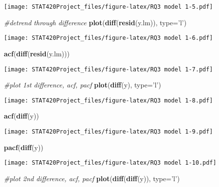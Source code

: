 \documentclass[]{article}
\newenvironment{Shaded}{\begin{snugshade}}{\end{snugshade}}
\newcommand{\CommentTok}[1]{\textcolor[rgb]{0.56,0.35,0.01}{\textit{#1}}}
\newcommand{\DataTypeTok}[1]{\textcolor[rgb]{0.13,0.29,0.53}{#1}}
\newcommand{\KeywordTok}[1]{\textcolor[rgb]{0.13,0.29,0.53}{\textbf{#1}}}
\newcommand{\NormalTok}[1]{#1}
\newcommand{\StringTok}[1]{\textcolor[rgb]{0.31,0.60,0.02}{#1}}
\begin{document}
\texttt{[image: STAT420Project\_files/figure-latex/RQ3 model 1-5.pdf]}

\begin{Shaded}
\begin{Highlighting}[]
\CommentTok{#detrend through difference}
\KeywordTok{plot}\NormalTok{(}\KeywordTok{diff}\NormalTok{(}\KeywordTok{resid}\NormalTok{(y.lm)), }\DataTypeTok{type=}\StringTok{'l'}\NormalTok{)}
\end{Highlighting}
\end{Shaded}

\texttt{[image: STAT420Project\_files/figure-latex/RQ3 model 1-6.pdf]}

\begin{Shaded}
\begin{Highlighting}[]
\KeywordTok{acf}\NormalTok{(}\KeywordTok{diff}\NormalTok{(}\KeywordTok{resid}\NormalTok{(y.lm)))}
\end{Highlighting}
\end{Shaded}

\texttt{[image: STAT420Project\_files/figure-latex/RQ3 model 1-7.pdf]}

\begin{Shaded}
\begin{Highlighting}[]
\CommentTok{#plot 1st difference, acf, pacf}
\KeywordTok{plot}\NormalTok{(}\KeywordTok{diff}\NormalTok{(y), }\DataTypeTok{type=}\StringTok{'l'}\NormalTok{)}
\end{Highlighting}
\end{Shaded}

\texttt{[image: STAT420Project\_files/figure-latex/RQ3 model 1-8.pdf]}

\begin{Shaded}
\begin{Highlighting}[]
\KeywordTok{acf}\NormalTok{(}\KeywordTok{diff}\NormalTok{(y))}
\end{Highlighting}
\end{Shaded}

\texttt{[image: STAT420Project\_files/figure-latex/RQ3 model 1-9.pdf]}

\begin{Shaded}
\begin{Highlighting}[]
\KeywordTok{pacf}\NormalTok{(}\KeywordTok{diff}\NormalTok{(y))}
\end{Highlighting}
\end{Shaded}

\texttt{[image: STAT420Project\_files/figure-latex/RQ3 model 1-10.pdf]}

\begin{Shaded}
\begin{Highlighting}[]
\CommentTok{#plot 2nd difference, acf, pacf}
\KeywordTok{plot}\NormalTok{(}\KeywordTok{diff}\NormalTok{(}\KeywordTok{diff}\NormalTok{(y)), }\DataTypeTok{type=}\StringTok{'l'}\NormalTok{)}
\end{Highlighting}
\end{Shaded}
\end{document}
